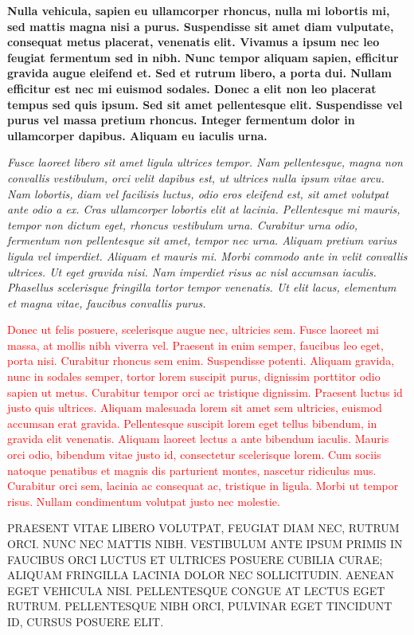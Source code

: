 \documentclass{article}
\begin{document}
{\textbf{Nulla vehicula, sapien eu ullamcorper rhoncus, nulla mi lobortis mi, sed mattis magna nisi a purus. Suspendisse sit amet diam vulputate, consequat metus placerat, venenatis elit. Vivamus a ipsum nec leo feugiat fermentum sed in nibh. Nunc tempor aliquam sapien, efficitur gravida augue eleifend et. Sed et rutrum libero, a porta dui. Nullam efficitur est nec mi euismod sodales. Donec a elit non leo placerat tempus sed quis ipsum. Sed sit amet pellentesque elit. Suspendisse vel purus vel massa pretium rhoncus. Integer fermentum dolor in ullamcorper dapibus. Aliquam eu iaculis urna.}

\textit{Fusce laoreet libero sit amet ligula ultrices tempor. Nam pellentesque, magna non convallis vestibulum, orci velit dapibus est, ut ultrices nulla ipsum vitae arcu. Nam lobortis, diam vel facilisis luctus, odio eros eleifend est, sit amet volutpat ante odio a ex. Cras ullamcorper lobortis elit at lacinia. Pellentesque mi mauris, tempor non dictum eget, rhoncus vestibulum urna. Curabitur urna odio, fermentum non pellentesque sit amet, tempor nec urna. Aliquam pretium varius ligula vel imperdiet. Aliquam et mauris mi. Morbi commodo ante in velit convallis ultrices. Ut eget gravida nisi. Nam imperdiet risus ac nisl accumsan iaculis. Phasellus scelerisque fringilla tortor tempor venenatis. Ut elit lacus, elementum et magna vitae, faucibus convallis purus.}

\textcolor{red}{Donec ut felis posuere, scelerisque augue nec, ultricies sem. Fusce laoreet mi massa, at mollis nibh viverra vel. Praesent in enim semper, faucibus leo eget, porta nisi. Curabitur rhoncus sem enim. Suspendisse potenti. Aliquam gravida, nunc in sodales semper, tortor lorem suscipit purus, dignissim porttitor odio sapien ut metus. Curabitur tempor orci ac tristique dignissim. Praesent luctus id justo quis ultrices. Aliquam malesuada lorem sit amet sem ultricies, euismod accumsan erat gravida. Pellentesque suscipit lorem eget tellus bibendum, in gravida elit venenatis. Aliquam laoreet lectus a ante bibendum iaculis. Mauris orci odio, bibendum vitae justo id, consectetur scelerisque lorem. Cum sociis natoque penatibus et magnis dis parturient montes, nascetur ridiculus mus. Curabitur orci sem, lacinia ac consequat ac, tristique in ligula. Morbi ut tempor risus. Nullam condimentum volutpat justo nec molestie.}

\uppercase{Praesent vitae libero volutpat, feugiat diam nec, rutrum orci. Nunc nec mattis nibh. Vestibulum ante ipsum primis in faucibus orci luctus et ultrices posuere cubilia Curae; Aliquam fringilla lacinia dolor nec sollicitudin. Aenean eget vehicula nisi. Pellentesque congue at lectus eget rutrum. Pellentesque nibh orci, pulvinar eget tincidunt id, cursus posuere elit.}

}
\end{document}
